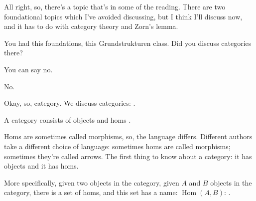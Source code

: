 \begin{speech}[01:06:13 - 01:07:09]
All right, so, there's a topic that's in some of the reading. There are two foundational topics which I've avoided discussing, but I think I'll discuss now, and it has to do with category theory and Zorn's lemma.

You had this foundations, this Grundstrukturen class. Did you discuss categories there?

You can say no.
\end{speech}

\begin{student}
No.
\end{student}

\begin{speech}[01:07:09 - 01:07:57]
Okay, so, category. We discuss categories: .

A category consists of objects and homs .

Homs are sometimes called morphisms,  so, the language differs. Different authors take a different choice of language: sometimes homs are called morphisms; sometimes they're called arrows. The first thing to know about a category: it has objects and it has homs.

More specifically, given two objects in the category,  given $A$ and $B$ objects in the category, there is a set of homs, and this set has a name: $\operatorname{Hom}(A, B)$: .
\end{speech}

